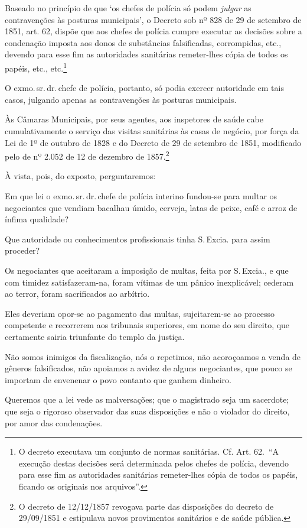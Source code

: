 Baseado no princípio de que `os chefes de polícia só podem \emph{julgar}
as contravenções às posturas municipais', o Decreto sob nº 828 de 29 de
setembro de 1851, art. 62, dispõe que aos chefes de polícia cumpre
executar as decisões sobre a condenação imposta aos donos de substâncias
falsificadas, corrompidas, etc., devendo para esse fim as autoridades
sanitárias remeter-lhes cópia de todos os papéis, etc., etc.\footnote{
  O decreto executava um conjunto de normas sanitárias. Cf. Art. 62.~``A
  execução destas decisões será determinada pelos chefes de polícia,
  devendo para esse fim as autoridades sanitárias remeter-lhes cópia de
  todos os papéis, ficando os originais nos arquivos''.}

O exmo.\,sr.\,dr.\,chefe de polícia, portanto, só podia exercer autoridade
em tais casos, julgando apenas as contravenções às posturas municipais.

Às Câmaras Municipais, por seus agentes, aos inspetores de saúde cabe
cumulativamente o serviço das visitas sanitárias às casas de negócio,
por força da Lei de 1º de outubro de 1828 e do Decreto de 29 de setembro
de 1851, modificado pelo de nº 2.052 de 12 de dezembro de
1857.\footnote{O decreto de 12/12/1857 revogava parte das disposições
  do decreto de 29/09/1851 e estipulava novos provimentos sanitários e
  de saúde pública.}

À vista, pois, do exposto, perguntaremos:

Em que lei o exmo.\,sr.\,dr.\,chefe de polícia interino fundou-se para
multar os negociantes que vendiam bacalhau úmido, cerveja, latas de
peixe, café e arroz de ínfima qualidade?

Que autoridade ou conhecimentos profissionais tinha S.\,Excia. para assim
proceder?

Os negociantes que aceitaram a imposição de multas, feita por S.\,Excia.,
e que com timidez satisfazeram-na, foram vítimas de um pânico
inexplicável; cederam ao terror, foram sacrificados ao arbítrio.

Eles deveriam opor-se ao pagamento das multas, sujeitarem-se ao processo
competente e recorrerem aos tribunais superiores, em nome do seu
direito, que certamente sairia triunfante do templo da justiça.

Não somos inimigos da fiscalização, nós o repetimos, não acoroçoamos a
venda de gêneros falsificados, não apoiamos a avidez de alguns
negociantes, que pouco se importam de envenenar o povo contanto que
ganhem dinheiro.

Queremos que a lei vede as malversações; que o magistrado seja um
sacerdote; que seja o rigoroso observador das suas disposições e não o
violador do direito, por amor das condenações.

